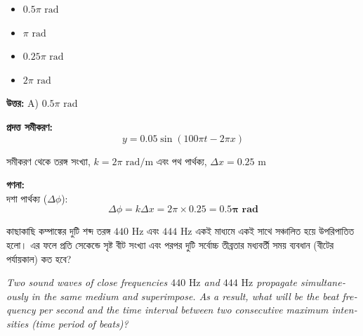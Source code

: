 \documentclass[12pt, a4paper]{article}
\begin{document}
\begin{itemize}[label={}, leftmargin=1cm, itemsep=0.5em]
    \item[\textbf{A)}] $0.5\pi\text{ rad}$
    \item[\textbf{B)}] $\pi\text{ rad}$
    \item[\textbf{C)}] $0.25\pi\text{ rad}$
    \item[\textbf{D)}] $2\pi\text{ rad}$
\end{itemize}

\vspace{0.5em}
\begin{tcolorbox}[answerbox]
    \textbf{\color{success} উত্তর:} A) $0.5\pi\text{ rad}$
\end{tcolorbox}
\vspace{1em}

\begin{tcolorbox}[solutionbox={সমাধান (Solution)}]
    \noindent
    \textbf{প্রদত্ত সমীকরণ:}
    \[ y = 0.05 \sin(100\pi t - 2\pi x) \]
    
    সমীকরণ থেকে তরঙ্গ সংখ্যা, $k = 2\pi\text{ rad/m}$ এবং পথ পার্থক্য, $\Delta x = 0.25\text{ m}$

    \vspace{0.6em}
    \noindent\textbf{গণনা:} \\
    দশা পার্থক্য ($\Delta \phi$):
    \[ \Delta \phi = k \Delta x = 2\pi \times 0.25 = \mathbf{0.5\pi\text{ rad}} \]
\end{tcolorbox}


\begin{tcolorbox}[questionbox={প্রশ্ন (Question) 9}]
    \noindent
    কাছাকাছি কম্পাঙ্কের দুটি শব্দ তরঙ্গ $440\text{ Hz}$ এবং $444\text{ Hz}$ একই মাধ্যমে একই সাথে সঞ্চালিত হয়ে উপরিপাতিত হলো। এর ফলে প্রতি সেকেন্ডে সৃষ্ট বীট সংখ্যা এবং পরপর দুটি সর্বোচ্চ তীব্রতার মধ্যবর্তী সময় ব্যবধান (বীটের পর্যায়কাল) কত হবে?
    
    \vspace{0.8em}
    \begin{english}
    \noindent\textit{\color{darkgray}
    Two sound waves of close frequencies $440\text{ Hz}$ and $444\text{ Hz}$ propagate simultaneously in the same medium and superimpose. As a result, what will be the beat frequency per second and the time interval between two consecutive maximum intensities (time period of beats)?
    }
    \end{english}
\end{tcolorbox}
\end{document}
